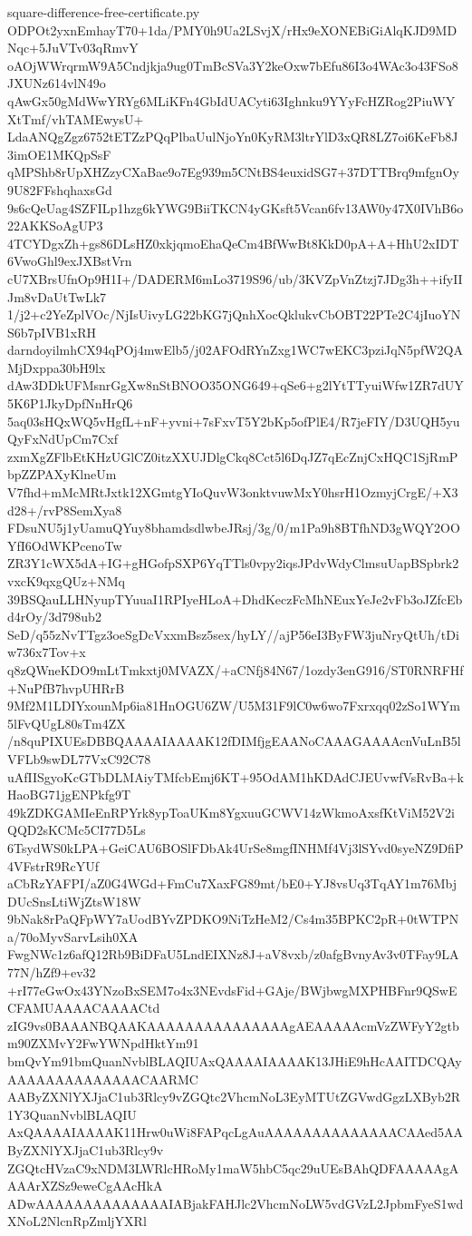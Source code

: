 \documentclass[11pt]{article}
\theoremstyle{definition}
\theoremstyle{remark}
\begin{document}
\begin{filecontents*}[overwrite]{square-difference-free-certificate.py}
ODPOt2yxnEmhayT70+1da/PMY0h9Ua2LSvjX/rHx9eXONEBiGiAlqKJD9MDNqc+5JuVTv03qRmvY
oAOjWWrqrmW9A5Cndjkja9ug0TmBcSVa3Y2keOxw7bEfu86I3o4WAc3o43FSo8JXUNz614vlN49o
qAwGx50gMdWwYRYg6MLiKFn4GbIdUACyti63Ighnku9YYyFcHZRog2PiuWYXtTmf/vhTAMEwysU+
LdaANQgZgz6752tETZzPQqPlbaUulNjoYn0KyRM3ltrYlD3xQR8LZ7oi6KeFb8J3imOE1MKQpSsF
qMPShb8rUpXHZzyCXaBae9o7Eg939m5CNtBS4euxidSG7+37DTTBrq9mfgnOy9U82FFshqhaxsGd
9s6cQeUag4SZFILp1hzg6kYWG9BiiTKCN4yGKsft5Vcan6fv13AW0y47X0IVhB6o22AKKSoAgUP3
4TCYDgxZh+gs86DLsHZ0xkjqmoEhaQeCm4BfWwBt8KkD0pA+A+HhU2xIDT6VwoGhl9exJXBstVrn
cU7XBrsUfnOp9H1I+/DADERM6mLo3719S96/ub/3KVZpVnZtzj7JDg3h++ifyIIJm8vDaUtTwLk7
1/j2+c2YeZplVOc/NjIsUivyLG22bKG7jQnhXocQklukvCbOBT22PTe2C4jIuoYNS6b7pIVB1xRH
darndoyilmhCX94qPOj4mwElb5/j02AFOdRYnZxg1WC7wEKC3pziJqN5pfW2QAMjDxppa30bH9lx
dAw3DDkUFMsnrGgXw8nStBNOO35ONG649+qSe6+g2lYtTTyuiWfw1ZR7dUY5K6P1JkyDpfNnHrQ6
5aq03sHQxWQ5vHgfL+nF+yvni+7sFxvT5Y2bKp5ofPlE4/R7jeFIY/D3UQH5yuQyFxNdUpCm7Cxf
zxmXgZFlbEtKHzUGlCZ0itzXXUJDlgCkq8Cct5l6DqJZ7qEcZnjCxHQC1SjRmPbpZZPAXyKlneUm
V7fhd+mMcMRtJxtk12XGmtgYIoQuvW3onktvuwMxY0hsrH1OzmyjCrgE/+X3d28+/rvP8SemXya8
FDsuNU5j1yUamuQYuy8bhamdsdlwbeJRsj/3g/0/m1Pa9h8BTfhND3gWQY2OOYfI6OdWKPcenoTw
ZR3Y1cWX5dA+IG+gHGofpSXP6YqTTls0vpy2iqsJPdvWdyClmsuUapBSpbrk2vxcK9qxgQUz+NMq
39BSQauLLHNyupTYuuaI1RPIyeHLoA+DhdKeczFcMhNEuxYeJe2vFb3oJZfcEbd4rOy/3d798ub2
SeD/q55zNvTTgz3oeSgDcVxxmBsz5sex/hyLY//ajP56eI3ByFW3juNryQtUh/tDiw736x7Tov+x
q8zQWneKDO9mLtTmkxtj0MVAZX/+aCNfj84N67/1ozdy3enG916/ST0RNRFHf+NuPfB7hvpUHRrB
9Mf2M1LDIYxounMp6ia81HnOGU6ZW/U5M31F9lC0w6wo7Fxrxqq02zSo1WYm5lFvQUgL80sTm4ZX
/n8quPIXUEsDBBQAAAAIAAAAK12fDIMfjgEAANoCAAAGAAAAcnVuLnB5lVFLb9swDL77VxC92C78
uAfIISgyoKcGTbDLMAiyTMfcbEmj6KT+95OdAM1hKDAdCJEUvwfVsRvBa+kHaoBG71jgENPkfg9T
49kZDKGAMIeEnRPYrk8ypToaUKm8YgxuuGCWV14zWkmoAxsfKtViM52V2iQQD2sKCMc5CI77D5Ls
6TsydWS0kLPA+GeiCAU6BOSlFDbAk4UrSe8mgfINHMf4Vj3lSYvd0syeNZ9DfiP4VFstrR9RcYUf
aCbRzYAFPI/aZ0G4WGd+FmCu7XaxFG89mt/bE0+YJ8vsUq3TqAY1m76MbjDUcSnsLtiWjZtsW18W
9bNak8rPaQFpWY7aUodBYvZPDKO9NiTzHeM2/Cs4m35BPKC2pR+0tWTPNa/70oMyvSarvLsih0XA
FwgNWc1z6afQ12Rb9BiDFaU5LndEIXNz8J+aV8vxb/z0afgBvnyAv3v0TFay9LA77N/hZf9+ev32
+rI77eGwOx43YNzoBxSEM7o4x3NEvdsFid+GAje/BWjbwgMXPHBFnr9QSwECFAMUAAAACAAAACtd
zIG9vs0BAAANBQAAKAAAAAAAAAAAAAAAgAEAAAAAcmVzZWFyY2gtbm90ZXMvY2FwYWNpdHktYm91
bmQvYm91bmQuanNvblBLAQIUAxQAAAAIAAAAK13JHiE9hHcAAITDCQAyAAAAAAAAAAAAAACAARMC
AAByZXNlYXJjaC1ub3Rlcy9vZGQtc2VhcmNoL3EyMTUtZGVwdGgzLXByb2R1Y3QuanNvblBLAQIU
AxQAAAAIAAAAK11Hrw0uWi8FAPqcLgAuAAAAAAAAAAAAAACAAed5AAByZXNlYXJjaC1ub3Rlcy9v
ZGQtcHVzaC9xNDM3LWRlcHRoMy1maW5hbC5qc29uUEsBAhQDFAAAAAgAAAArXZSz9eweCgAAcHkA
ADwAAAAAAAAAAAAAAIABjakFAHJlc2VhcmNoLW5vdGVzL2JpbmFyeS1wdXNoL2NlcnRpZmljYXRl

\end{filecontents*}
\end{document}
